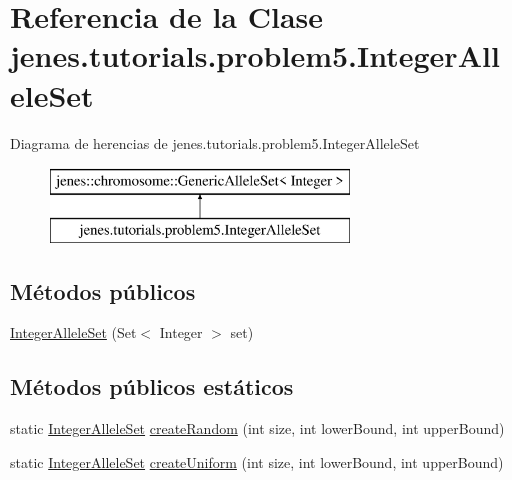 \hypertarget{classjenes_1_1tutorials_1_1problem5_1_1_integer_allele_set}{\section{Referencia de la Clase jenes.\-tutorials.\-problem5.\-Integer\-Allele\-Set}
\label{classjenes_1_1tutorials_1_1problem5_1_1_integer_allele_set}
}
Diagrama de herencias de jenes.\-tutorials.\-problem5.\-Integer\-Allele\-Set\begin{figure}[H]
\begin{center}
\leavevmode
\includegraphics[height=2.000000cm]{classjenes_1_1tutorials_1_1problem5_1_1_integer_allele_set}
\end{center}
\end{figure}
\subsection*{Métodos públicos}
\begin{DoxyCompactItemize}
\item 
\hyperlink{classjenes_1_1tutorials_1_1problem5_1_1_integer_allele_set_aa8b7a7bdc514aca55686da39f7e430b6}{Integer\-Allele\-Set} (Set$<$ Integer $>$ set)
\end{DoxyCompactItemize}
\subsection*{Métodos públicos estáticos}
\begin{DoxyCompactItemize}
\item 
static \hyperlink{classjenes_1_1tutorials_1_1problem5_1_1_integer_allele_set}{Integer\-Allele\-Set} \hyperlink{classjenes_1_1tutorials_1_1problem5_1_1_integer_allele_set_af241f0e8dd6564fb5b4c0047eb150bac}{create\-Random} (int size, int lower\-Bound, int upper\-Bound)
\item 
static \hyperlink{classjenes_1_1tutorials_1_1problem5_1_1_integer_allele_set}{Integer\-Allele\-Set} \hyperlink{classjenes_1_1tutorials_1_1problem5_1_1_integer_allele_set_a20d2ef7f0a59edafa82345db48fcefa3}{create\-Uniform} (int size, int lower\-Bound, int upper\-Bound)
\end{DoxyCompactItemize}


